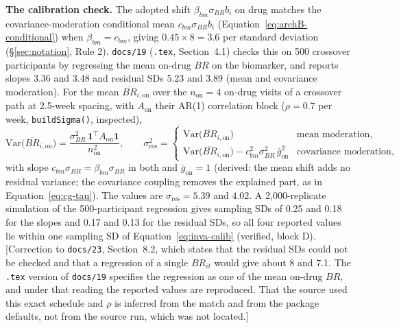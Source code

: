 \documentclass[11pt]{article}
\newcommand{\note}[1]{\textcolor{blue!60!black}{\small [#1]}}
\newcommand{\code}[1]{\texttt{#1}}
\begin{document}
\textbf{The calibration check.} The adopted shift
$\beta_{bm}\sigma_{BR}b_i$ on drug matches the covariance-moderation
conditional mean $c_{bm}\sigma_{BR}b_i$ (Equation~\eqref{eq:archB-conditional})
when $\beta_{bm} = c_{bm}$, giving $0.45\times8 = 3.6$ per standard
deviation (\S\ref{sec:notation}, Rule 2). \code{docs/19}
(\code{.tex}, Section~4.1) checks this on 500 crossover participants by
regressing the mean on-drug $BR$ on the biomarker, and reports slopes
3.36 and 3.48 and residual SDs 5.23 and 3.89 (mean and covariance
moderation). For the mean $\overline{BR}_{i,\mathrm{on}}$ over the
$n_{\mathrm{on}} = 4$ on-drug visits of a crossover path at 2.5-week
spacing, with $A_{\mathrm{on}}$ their AR(1) correlation block
($\rho = 0.7$ per week, \code{buildSigma()}, inspected),
\begin{equation}
\mathrm{Var}\big(\overline{BR}_{i,\mathrm{on}}\big) =
  \frac{\sigma_{BR}^2\,\mathbf 1^\top A_{\mathrm{on}}\mathbf 1}
       {n_{\mathrm{on}}^2},
\qquad
\sigma^2_{\mathrm{res}} = \begin{cases}
  \mathrm{Var}\big(\overline{BR}_{i,\mathrm{on}}\big) &
    \text{mean moderation}, \\
  \mathrm{Var}\big(\overline{BR}_{i,\mathrm{on}}\big)
    - c_{bm}^2\sigma_{BR}^2\,\bar g_{\mathrm{on}}^2 &
    \text{covariance moderation},
\end{cases}
\label{eq:inva-calib}
\end{equation}
with slope $c_{bm}\sigma_{BR} = \beta_{bm}\sigma_{BR}$ in both and
$\bar g_{\mathrm{on}} = 1$ (derived: the mean shift adds no residual
variance; the covariance coupling removes the explained part, as in
Equation~\eqref{eq:cg-tau}). The values are
$\sigma_{\mathrm{res}} = 5.39$ and $4.02$. A 2,000-replicate simulation
of the 500-participant regression gives sampling SDs of 0.25 and 0.18
for the slopes and 0.17 and 0.13 for the residual SDs, so all four
reported values lie within one sampling SD of
Equation~\eqref{eq:inva-calib} (verified, block D).
\note{Correction to \code{docs/23}, Section~8.2, which states that the
residual SDs could not be checked and that a regression of a single
$BR_{it}$ would give about 8 and 7.1. The \code{.tex} version of
\code{docs/19} specifies the regression as one of the mean on-drug
$BR$, and under that reading the reported values are reproduced. That
the source used this exact schedule and $\rho$ is inferred from the
match and from the package defaults, not from the source run, which was
not located.}

\end{document}
